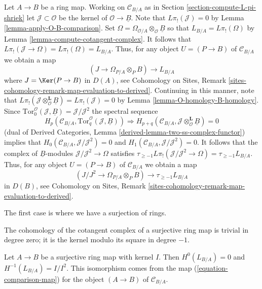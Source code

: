 \begin{remark}
\label{remark-make-map}
Let $A \to B$ be a ring map.  Working on $\mathcal{C}_{B/A}$ as in
Section \ref{section-compute-L-pi-shriek} let
$\mathcal{J} \subset \mathcal{O}$ be the kernel of
$\mathcal{O} \to \underline{B}$. Note that $L\pi_!(\mathcal{J}) = 0$ by
Lemma \ref{lemma-apply-O-B-comparison}. Set
$\Omega =  \Omega_{\mathcal{O}/A} \otimes_\mathcal{O} \underline{B}$
so that
$L_{B/A} = L\pi_!(\Omega)$ by Lemma \ref{lemma-compute-cotangent-complex}.
It follows that $L\pi_!(\mathcal{J} \to \Omega) = L\pi_!(\Omega) = L_{B/A}$.
Thus, for any object $U = (P \to B)$ of $\mathcal{C}_{B/A}$ we obtain a map
\begin{equation}
\label{equation-comparison-map-A}
(J \to \Omega_{P/A} \otimes_P B) \longrightarrow L_{B/A}
\end{equation}
where $J = \Ker(P \to B)$ in $D(A)$, see
Cohomology on Sites, Remark
\ref{sites-cohomology-remark-map-evaluation-to-derived}.
Continuing in this manner, note that
$L\pi_!(\mathcal{J} \otimes_\mathcal{O}^\mathbf{L} \underline{B}) =
L\pi_!(\mathcal{J}) = 0$ by
Lemma \ref{lemma-O-homology-B-homology}.
Since $\text{Tor}_0^\mathcal{O}(\mathcal{J}, \underline{B}) =
\mathcal{J}/\mathcal{J}^2$
the spectral sequence
$$
H_p(\mathcal{C}_{B/A}, \text{Tor}_q^\mathcal{O}(\mathcal{J}, \underline{B}))
\Rightarrow 
H_{p + q}(\mathcal{C}_{B/A},
\mathcal{J} \otimes_\mathcal{O}^\mathbf{L} \underline{B}) = 0
$$
(dual of
Derived Categories, Lemma \ref{derived-lemma-two-ss-complex-functor})
implies that
$H_0(\mathcal{C}_{B/A}, \mathcal{J}/\mathcal{J}^2) = 0$
and $H_1(\mathcal{C}_{B/A}, \mathcal{J}/\mathcal{J}^2) = 0$.
It follows that the complex of $\underline{B}$-modules
$\mathcal{J}/\mathcal{J}^2 \to \Omega$ satisfies
$\tau_{\geq -1}L\pi_!(\mathcal{J}/\mathcal{J}^2 \to \Omega) =
\tau_{\geq -1}L_{B/A}$.
Thus, for any object $U = (P \to B)$ of $\mathcal{C}_{B/A}$ we obtain a map
\begin{equation}
\label{equation-comparison-map}
(J/J^2 \to \Omega_{P/A} \otimes_P B) \longrightarrow \tau_{\geq -1}L_{B/A}
\end{equation}
in $D(B)$, see
Cohomology on Sites, Remark
\ref{sites-cohomology-remark-map-evaluation-to-derived}.
\end{remark}

\noindent
The first case is where we have a surjection of rings.

\begin{lemma}
\label{lemma-surjection}
\begin{slogan}
The cohomology of the cotangent complex of a surjective ring map is trivial in
degree zero; it is the kernel modulo its square in degree $-1$.
\end{slogan}
Let $A \to B$ be a surjective ring map with kernel $I$.
Then $H^0(L_{B/A}) = 0$ and $H^{-1}(L_{B/A}) = I/I^2$.
This isomorphism comes from the map (\ref{equation-comparison-map})
for the object $(A \to B)$ of $\mathcal{C}_{B/A}$.
\end{lemma}


